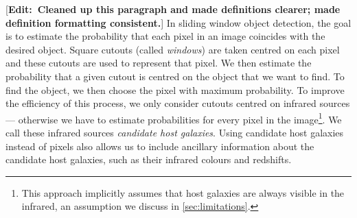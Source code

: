 \documentclass[fleqn,usenatbib,usedcolumn]{mnras}
\newcommand{\edit}[1]{ {\color{red}[{\bf Edit:~{#1}}]} }
\begin{document}
    \edit{Cleaned up this paragraph and made definitions clearer; made definition formatting consistent.} In sliding window object detection, the goal is to estimate the probability that each pixel in an image coincides with the desired object. Square cutouts (called \emph{windows}) are taken centred on each pixel and these cutouts are used to represent that pixel. We then estimate the probability that a given cutout is centred on the object that we want to find. To find the object, we then choose the pixel with maximum probability. To improve the efficiency of this process, we only consider cutouts centred on infrared sources --- otherwise we have to estimate probabilities for every pixel in the image\footnote{This approach implicitly assumes that host galaxies are always visible in the infrared, an assumption we discuss in \autoref{sec:limitations}.}. We call these infrared sources \emph{candidate host galaxies}. Using candidate host galaxies instead of pixels also allows us to include ancillary information about the candidate host galaxies, such as their infrared colours and redshifts.
\end{document}
